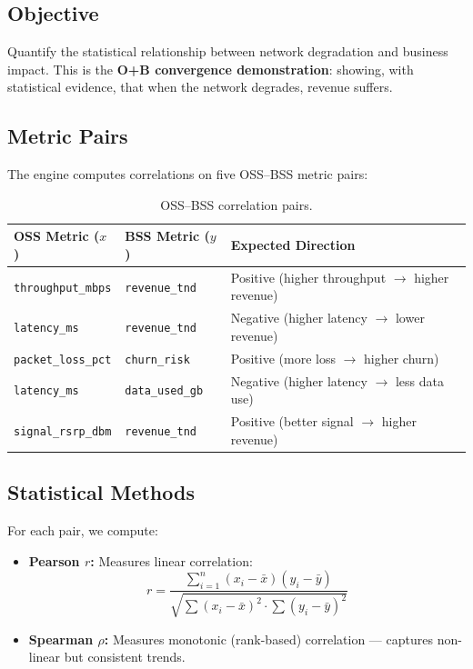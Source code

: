 \subsection{Objective}

Quantify the statistical relationship between network degradation and business impact. This is the \textbf{O+B convergence demonstration}: showing, with statistical evidence, that when the network degrades, revenue suffers.

\subsection{Metric Pairs}

The engine computes correlations on five OSS--BSS metric pairs:

\begin{table}[H]
\centering
\caption{OSS--BSS correlation pairs.}
\label{tab:corr-pairs}
\begin{tabular}{@{}lll@{}}
\toprule
\textbf{OSS Metric ($x$)} & \textbf{BSS Metric ($y$)} & \textbf{Expected Direction} \\
\midrule
\texttt{throughput\_mbps}    & \texttt{revenue\_tnd}   & Positive (higher throughput $\to$ higher revenue) \\
\texttt{latency\_ms}         & \texttt{revenue\_tnd}   & Negative (higher latency $\to$ lower revenue) \\
\texttt{packet\_loss\_pct}   & \texttt{churn\_risk}    & Positive (more loss $\to$ higher churn) \\
\texttt{latency\_ms}         & \texttt{data\_used\_gb} & Negative (higher latency $\to$ less data use) \\
\texttt{signal\_rsrp\_dbm}   & \texttt{revenue\_tnd}   & Positive (better signal $\to$ higher revenue) \\
\bottomrule
\end{tabular}
\end{table}

\subsection{Statistical Methods}

For each pair, we compute:

\begin{itemize}
  \item \textbf{Pearson $r$:} Measures linear correlation:
  $$r = \frac{\sum_{i=1}^{n}(x_i - \bar{x})(y_i - \bar{y})}{\sqrt{\sum(x_i - \bar{x})^2 \cdot \sum(y_i - \bar{y})^2}}$$
  
  \item \textbf{Spearman $\rho$:} Measures monotonic (rank-based) correlation --- captures non-linear but consistent trends.
\end{itemize}

